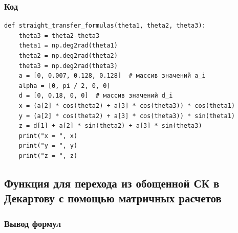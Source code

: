 \documentclass{article}
\begin{document}
\subsubsection*{Код}
\begin{verbatim}
def straight_transfer_formulas(theta1, theta2, theta3):
    theta3 = theta2-theta3
    theta1 = np.deg2rad(theta1)
    theta2 = np.deg2rad(theta2)
    theta3 = np.deg2rad(theta3)
    a = [0, 0.007, 0.128, 0.128]  # массив значений a_i
    alpha = [0, pi / 2, 0, 0]
    d = [0, 0.18, 0, 0]  # массив значений d_i
    x = (a[2] * cos(theta2) + a[3] * cos(theta3)) * cos(theta1)
    y = (a[2] * cos(theta2) + a[3] * cos(theta3)) * sin(theta1)
    z = d[1] + a[2] * sin(theta2) + a[3] * sin(theta3)
    print("x = ", x)
    print("y = ", y)
    print("z = ", z)

\end{verbatim}

\subsection{Функция для перехода из обощенной СК в Декартову с помощью матричных расчетов}
\subsubsection*{Вывод формул}
\end{document}
